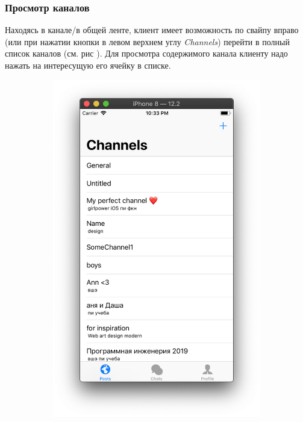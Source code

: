 \documentclass[a4paper,12pt]{article}
\begin{document}
	\subsubsection{Просмотр каналов}
	Находясь в канале/в общей ленте, клиент имеет возможность по свайпу вправо (или при нажатии кнопки в левом верхнем углу \textit{Channels}) перейти в полный список каналов (см. рис ). Для просмотра содержимого канала клиенту надо нажать на интересущую его ячейку в списке.
	\begin{figure}[h!]
		\centering
		\begin{subfigure}[b]{0.3\linewidth}
			\includegraphics[width=\linewidth]{../includes/pmi/channel_list.png}

\end{subfigure}
\end{figure}
\end{document}
